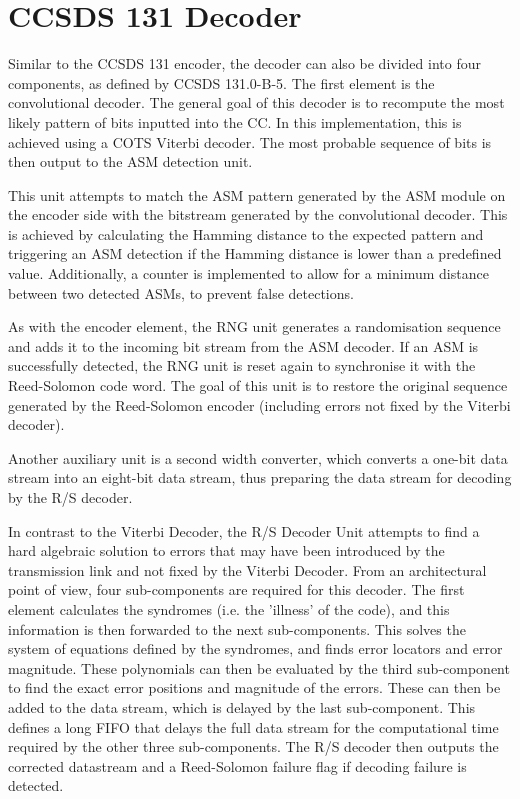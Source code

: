 \section{CCSDS 131 Decoder}

Similar to the CCSDS 131 encoder, the decoder can also be divided into four components, as defined by CCSDS 131.0-B-5. The first element is the convolutional decoder. The general goal of this decoder is to recompute the most likely pattern of bits inputted into the CC. In this implementation, this is achieved using a COTS Viterbi decoder. The most probable sequence of bits is then output to the ASM detection unit.

This unit attempts to match the ASM pattern generated by the ASM module on the encoder side with the bitstream generated by the convolutional decoder. This is achieved by calculating the Hamming distance to the expected pattern and triggering an ASM detection if the Hamming distance is lower than a predefined value. Additionally, a counter is implemented to allow for a minimum distance between two detected ASMs, to prevent false detections.

As with the encoder element, the RNG unit generates a randomisation sequence and adds it to the incoming bit stream from the ASM decoder. If an ASM is successfully detected, the RNG unit is reset again to synchronise it with the Reed-Solomon code word. The goal of this unit is to restore the original sequence generated by the Reed-Solomon encoder (including errors not fixed by the Viterbi decoder).

Another auxiliary unit is a second width converter, which converts a one-bit data stream into an eight-bit data stream, thus preparing the data stream for decoding by the R/S decoder.

In contrast to the Viterbi Decoder, the R/S Decoder Unit attempts to find a hard algebraic solution to errors that may have been introduced by the transmission link and not fixed by the Viterbi Decoder. From an architectural point of view, four sub-components are required for this decoder. The first element calculates the syndromes (i.e. the 'illness' of the code), and this information is then forwarded to the next sub-components. This solves the system of equations defined by the syndromes, and finds error locators and error magnitude. These polynomials can then be evaluated by the third sub-component to find the exact error positions and magnitude of the errors. These can then be added to the data stream, which is delayed by the last sub-component. This defines a long FIFO that delays the full data stream for the computational time required by the other three sub-components. The R/S decoder then outputs the corrected datastream and a Reed-Solomon failure flag if decoding failure is detected.

